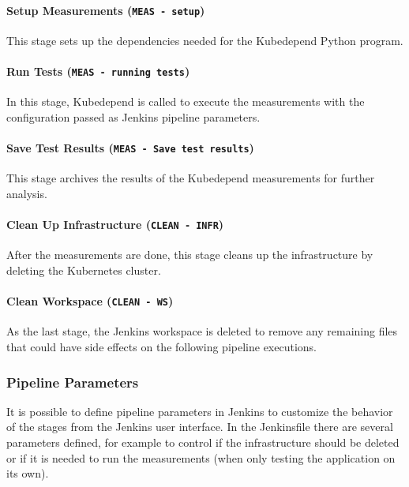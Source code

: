 \paragraph{Setup Measurements (\texttt{MEAS - setup})} This stage sets up the dependencies needed for the Kubedepend Python program.

\paragraph{Run Tests (\texttt{MEAS - running tests})} In this stage, Kubedepend is called to execute the measurements with the configuration passed as Jenkins pipeline parameters.

\paragraph{Save Test Results (\texttt{MEAS - Save test results})} This stage archives the results of the Kubedepend measurements for further analysis.

\paragraph{Clean Up Infrastructure (\texttt{CLEAN - INFR})} After the measurements are done, this stage cleans up the infrastructure by deleting the Kubernetes cluster.

\paragraph{Clean Workspace (\texttt{CLEAN - WS})} As the last stage, the Jenkins workspace is deleted to remove any remaining files that could have side effects on the following pipeline executions.

\subsubsection{Pipeline Parameters}

It is possible to define pipeline parameters in Jenkins to customize the behavior of the stages from the Jenkins user interface. In the Jenkinsfile there are several parameters defined, for example to control if the infrastructure should be deleted or if it is needed to run the measurements (\eg when only testing the application on its own).

